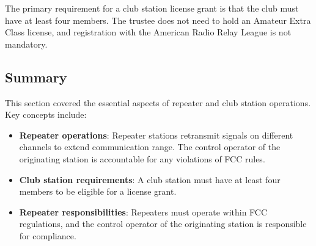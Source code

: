 The primary requirement for a club station license grant is that the club must have at least four members. The trustee does not need to hold an Amateur Extra Class license, and registration with the American Radio Relay League is not mandatory.


\subsection*{Summary}
This section covered the essential aspects of repeater and club station operations. Key concepts include:

\begin{itemize}
    \item \textbf{Repeater operations}: Repeater stations retransmit signals on different channels to extend communication range. The control operator of the originating station is accountable for any violations of FCC rules.
    \item \textbf{Club station requirements}: A club station must have at least four members to be eligible for a license grant.
    \item \textbf{Repeater responsibilities}: Repeaters must operate within FCC regulations, and the control operator of the originating station is responsible for compliance.
\end{itemize}
